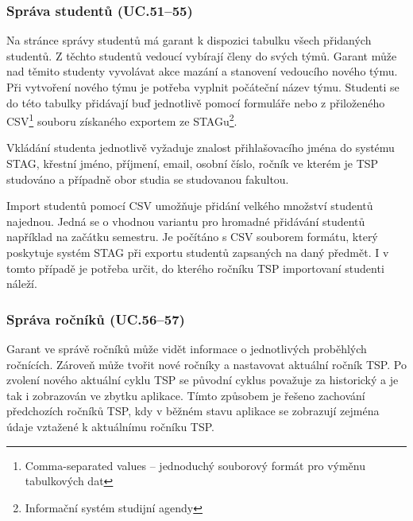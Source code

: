 \documentclass[czech,BP]{thesiskiv}
\begin{document}
			\subsubsection{Správa studentů (UC.51--55)}
			\par Na stránce správy studentů má garant k dispozici tabulku všech přidaných studentů. Z těchto studentů vedoucí vybírají členy do svých týmů. Garant může nad těmito studenty vyvolávat akce mazání a stanovení vedoucího nového týmu. Při vytvoření nového týmu je potřeba vyplnit počáteční název týmu. Studenti se do této tabulky přidávají buď jednotlivě pomocí formuláře nebo z přiloženého CSV\footnote{Comma-separated values -- jednoduchý souborový formát pro výměnu tabulkových dat} souboru získaného exportem ze STAGu\footnote{Informační systém studijní agendy}.
			\par Vkládání studenta jednotlivě vyžaduje znalost přihlašovacího jména do systému STAG, křestní jméno, příjmení, email, osobní číslo, ročník ve kterém je TSP studováno a případně obor studia se studovanou fakultou.
			\par Import studentů pomocí CSV umožňuje přidání velkého množství studentů najednou. Jedná se o vhodnou variantu pro hromadné přidávání studentů například na začátku semestru. Je počítáno s CSV souborem formátu, který poskytuje systém STAG při exportu studentů zapsaných na daný předmět. I v tomto případě je potřeba určit, do kterého ročníku TSP importovaní studenti náleží.
			\subsubsection{Správa ročníků (UC.56--57)}
			\par Garant ve správě ročníků může vidět informace o jednotlivých proběhlých ročnících. Zároveň může tvořit nové ročníky a nastavovat aktuální ročník TSP. Po zvolení nového aktuální cyklu TSP se původní cyklus považuje za historický a je tak i zobrazován ve zbytku aplikace. Tímto způsobem je řešeno zachování předchozích ročníků TSP, kdy v běžném stavu aplikace se zobrazují zejména údaje vztažené k aktuálnímu ročníku TSP.
\end{document}
